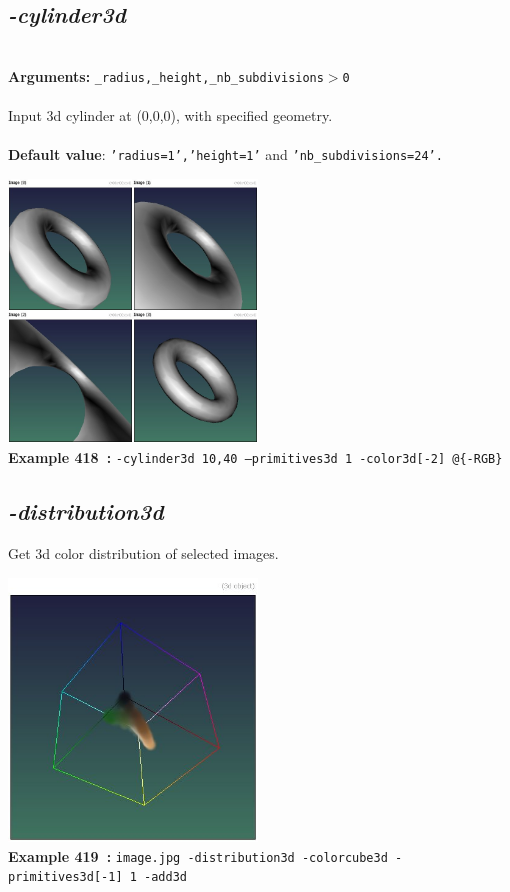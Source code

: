 \documentclass[a4paper,11pt,twoside]{book}
\begin{document}
\subsection{\emph{-cylinder3d} }\vspace*{-0.5em}
~\\\textbf{Arguments: } 
{\small \texttt{\_radius,\_height,\_nb\_subdivisions$>$0}}\\~\\
Input 3d cylinder at (0,0,0), with specified geometry.
~\\~\\\textbf{Default value}: {\small \texttt{'radius=1','height=1'} and \texttt{'nb\_subdivisions=24'.}}
\begin{center}\includegraphics[keepaspectratio=true,height=7cm,width=\textwidth]{img/gmic_def418.jpg}\\
{\footnotesize \textbf{Example 418~:} \texttt{-cylinder3d 10,40 --primitives3d 1 -color3d[-2] @\{-RGB\}}}
\end{center}

\subsection{\emph{-distribution3d} }\vspace*{-0.5em}
Get 3d color distribution of selected images.
\begin{center}\includegraphics[keepaspectratio=true,height=7cm,width=\textwidth]{img/gmic_def419.jpg}\\
{\footnotesize \textbf{Example 419~:} \texttt{image.jpg -distribution3d -colorcube3d -primitives3d[-1] 1 -add3d}}
\end{center}
\end{document}
